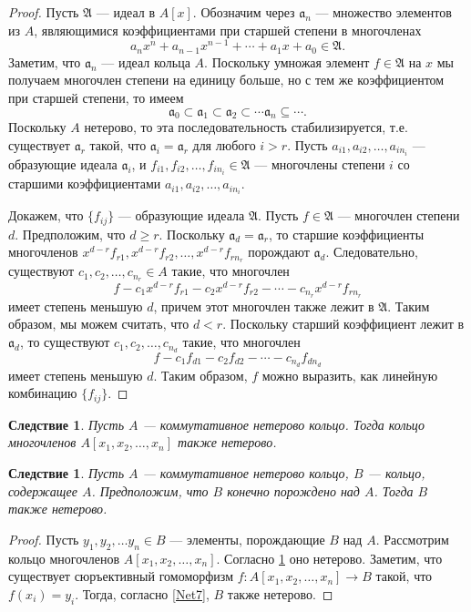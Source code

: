 \documentclass[12pt, titlepage, oneside]{amsbook}
\newcommand{\AAA}{\mathfrak{A}}
\newcommand{\aaa}{\mathfrak{a}}
\newtheorem{corollary}[theorem]{Следствие}
\theoremstyle{definition}
\theoremstyle{remark}
\begin{document}
\begin{proof}
	Пусть $\AAA$ --- идеал в $A[x]$. Обозначим через $\aaa_n$ --- множество элементов из $A$, являющимися коэффициентами при старшей степени в многочленах $$a_n x^n+a_{n-1}x^{n-1}+\cdots+a_1 x+a_0\in\AAA.$$ Заметим, что $\aaa_n$ --- идеал кольца $A$. Поскольку умножая элемент $f\in\AAA$ на $x$ мы получаем многочлен степени на единицу больше, но с тем же коэффициентом при старшей степени, то имеем $$\aaa_0\subset\aaa_1\subset\aaa_2\subset\cdots\aaa_n\subseteq\cdots.$$ Поскольку $A$ нетерово, то эта последовательность стабилизируется, т.е. существует $\aaa_r$ такой, что $\aaa_i=\aaa_r$ для любого $i>r$. Пусть $a_{i1},a_{i2},\ldots,a_{in_i}$ --- образующие идеала $\aaa_i$, и $f_{i1},f_{i2},\ldots,f_{in_i}\in\AAA$ --- многочлены степени $i$ со старшими коэффициентами $a_{i1},a_{i2},\ldots,a_{in_i}$.
	
	Докажем, что $\{f_{ij}\}$ --- образующие идеала $\AAA$. Пусть $f\in\AAA$ --- многочлен степени $d$. Предположим, что $d\geq r$. Поскольку $\aaa_d=\aaa_r$, то старшие коэффициенты многочленов $x^{d-r}f_{r1},x^{d-r}f_{r2},\ldots,x^{d-r}f_{rn_r}$ порождают $\aaa_d$. Следовательно, существуют $c_1,c_2,\ldots, c_{n_r}\in A$ такие, что многочлен $$f-c_1x^{d-r}f_{r1}-c_2x^{d-r}f_{r2}-\cdots-c_{n_r}x^{d-r}f_{rn_r}$$ имеет степень меньшую $d$, причем этот многочлен также лежит в $\AAA$. Таким образом, мы можем считать, что $d<r$. Поскольку старший коэффициент лежит в $\aaa_d$, то существуют $c_1,c_2,\ldots,c_{n_d}$ такие, что многочлен $$f-c_1f_{d1}-c_2f_{d2}-\cdots-c_{n_d}f_{dn_d}$$ имеет степень меньшую $d$. Таким образом, $f$ можно выразить, как линейную комбинацию $\{f_{ij}\}$.
\end{proof}

\begin{corollary}
	\label{Net11}
	Пусть $A$ --- коммутативное нетерово кольцо. Тогда кольцо многочленов $A[x_1,x_2,\ldots,x_n]$ также нетерово.
\end{corollary}

\begin{corollary}
	\label{Net12}
	Пусть $A$ --- коммутативное нетерово кольцо, $B$ --- кольцо, содержащее $A$. Предположим, что $B$ конечно порождено над $A$. Тогда $B$ также нетерово.
\end{corollary}

\begin{proof}
	Пусть $y_1,y_2,\ldots y_n\in B$ --- элементы, порождающие $B$ над $A$. Рассмотрим кольцо многочленов $A[x_1,x_2,\ldots,x_n]$. Согласно \ref{Net11} оно нетерово. Заметим, что существует сюръективный гомоморфизм $f\colon A[x_1,x_2,\ldots,x_n]\rightarrow B$ такой, что $f(x_i)=y_i$. Тогда, согласно \ref{Net7}, $B$ также нетерово.
\end{proof}
\end{document}
